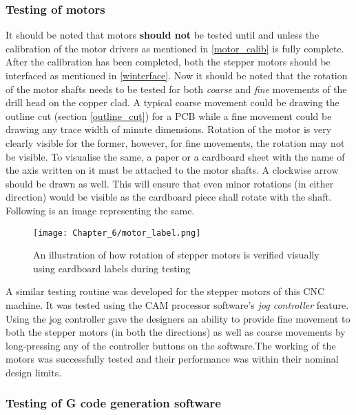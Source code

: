 \subsubsection*{Testing of motors}

It should be noted that motors \textbf{should not} be tested until and unless the calibration of the motor drivers as mentioned in \ref{motor_calib} is fully complete. After the calibration has been completed, both the stepper motors should be interfaced as mentioned in \ref{winterface}. Now it should be noted that the rotation of the motor shafts needs to be tested for both \textit{coarse} and \textit{fine} movements of the drill head on the copper clad. A typical coarse movement could be drawing the outline cut (section \ref{outline_cut}) for a PCB while a fine movement could be drawing any trace width of minute dimensions. Rotation of the motor is very clearly visible for the former, however, for fine movements, the rotation may not be visible. To visualise the same, a paper or a cardboard sheet with the name of the axis written on it must be attached to the motor shafts. A clockwise arrow should be drawn as well. This will ensure that even minor rotations (in either direction) would be visible as the cardboard piece shall rotate with the shaft. Following is an image representing the same. \par

\begin{figure}[h]
    \centering
    \texttt{[image: Chapter\_6/motor\_label.png]}
    \caption{An illustration of how rotation of stepper motors is verified visually using cardboard labels during testing}
    \label{fig:motorlabel}
\end{figure}

A similar testing routine was developed for the stepper motors of this CNC machine. It was tested using the CAM processor software’s \textit{jog controller} feature. Using the jog controller gave the designers an ability to provide fine movement to both the stepper motors (in both the directions) as well as coarse movements by long-pressing any of the controller buttons on the software.The working of the motors was successfully tested and their performance was within their nominal design limits.

\subsubsection*{Testing of G code generation software}

